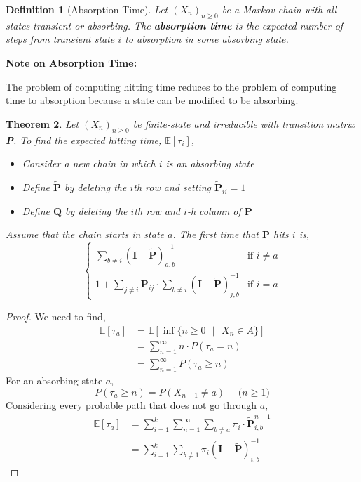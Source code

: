 \documentclass{tufte-handout}
\newtheorem{thm}{Theorem}
\newtheorem{defn}[thm]{Definition}
\begin{document}
  \begin{defn}[Absorption Time]
    Let $(X_n)_{n \geq 0}$ be a Markov chain with all states transient or absorbing. The \textbf{absorption time} is the expected number of steps from transient state $i$ to absorption in some absorbing state.
  \end{defn}

  \begin{marginfigure}
    \textbf{Note on Absorption Time:}

    \noindent The problem of computing hitting time reduces to the problem of computing time to absorption because a state can be modified to be absorbing.
  \end{marginfigure}

  \begin{thm}
    Let $(X_n)_{n \geq 0}$ be finite-state and irreducible with transition matrix \textbf{P}. To find the expected hitting time, $\mathbb{E}[\tau_i]$,
    \begin{itemize}
      \item Consider a new chain in which $i$ is an absorbing state
      \item Define $\boldsymbol{\tilde{P}}$ by deleting the $i$th row and setting $\boldsymbol{\tilde{P}}_{ii} = 1$
      \item Define $\boldsymbol{Q}$ by deleting the $i$th row and $i$-h column of $\boldsymbol{P}$
    \end{itemize}
  \noindent Assume that the chain starts in state $a$. The first time that $\boldsymbol{P}$ hits $i$ is,
  \[
    \begin{cases}
      \sum_{b \neq i} (\boldsymbol{I} - \boldsymbol{\tilde{P}})^{-1}_{a,b} & \text{if $i \neq a$} \\
      1 + \sum_{j \neq i} \boldsymbol{P}_{ij} \cdot \sum_{b \neq i} (\boldsymbol{I} - \boldsymbol{\tilde{P}})^{-1}_{j,b} & \text{if $i = a$}
    \end{cases}
  \] 
  \end{thm}

  \begin{proof}
    We need to find,
    \begin{align*}
      \mathbb{E}[\tau_a] &= \mathbb{E}[\inf \{n \geq 0 \text{ $|$ } X_n \in A\}] \\
      &= \sum_{n=1}^\infty n \cdot P(\tau_a = n) \\
      &= \sum_{n=1}^\infty P(\tau_a \geq n)
    \end{align*}
    \noindent For an absorbing state $a$,
    \[P(\tau_a \geq n) = P(X_{n-1} \neq a) \quad \text{ ($n \geq 1$)}\]
    \noindent Considering every probable path that does not go through $a$,
    \begin{align*}
      \mathbb{E}[\tau_a] &= \sum_{i = 1}^k \sum_{n = 1}^{\infty} \sum_{b \neq a} \pi_i \cdot \boldsymbol{\tilde{P}}_{i, b}^{n-1} \\
      &= \sum_{i = 1}^k \sum_{b \neq 1} \pi_i (\boldsymbol{I} - \boldsymbol{\tilde{P}})^{-1}_{i,b}
    \end{align*}
  \end{proof}
\end{document}
